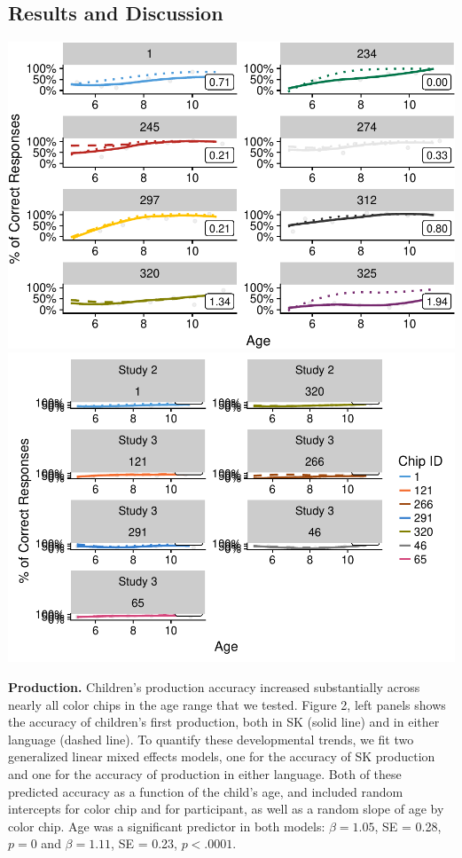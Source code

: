 \documentclass[,man,floatsintext]{apa6}
\theoremstyle{definition}
\theoremstyle{definition}
\theoremstyle{definition}
\theoremstyle{remark}
\begin{document}
\subsection{Results and Discussion}\label{results-and-discussion-1}

\includegraphics{amazon_color_files/figure-latex/childfigure-1.pdf}
\includegraphics{amazon_color_files/figure-latex/childfigure-2.pdf}

\textbf{Production.} Children's production accuracy increased
substantially across nearly all color chips in the age range that we
tested. Figure 2, left panels shows the accuracy of children's first
production, both in SK (solid line) and in either language (dashed
line). To quantify these developmental trends, we fit two generalized
linear mixed effects models, one for the accuracy of SK production and
one for the accuracy of production in either language. Both of these
predicted accuracy as a function of the child's age, and included random
intercepts for color chip and for participant, as well as a random slope
of age by color chip. Age was a significant predictor in both models:
\(\beta = 1.05\), SE = 0.28, \(p = 0\) and \(\beta = 1.11\), SE = 0.23,
\(p < .0001\).
\end{document}
